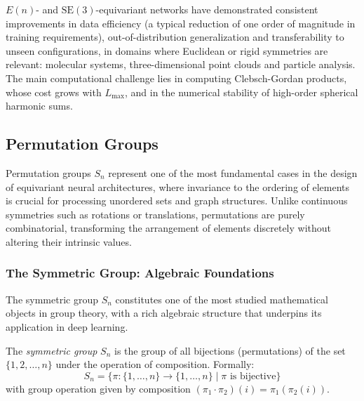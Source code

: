 $E(n)$- and $\text{SE}(3)$-equivariant networks have demonstrated consistent improvements in data efficiency (a typical reduction of one order of magnitude in training requirements), out-of-distribution generalization and transferability to unseen configurations, in domains where Euclidean or rigid symmetries are relevant: molecular systems, three-dimensional point clouds and particle analysis. The main computational challenge lies in computing Clebsch-Gordan products, whose cost grows with $L_{\max}$, and in the numerical stability of high-order spherical harmonic sums.

\subsection{Permutation Groups}\label{subsec:grupos_permutaciones}

Permutation groups $S_n$ represent one of the most fundamental cases in the design of equivariant neural architectures, where invariance to the ordering of elements is crucial for processing unordered sets and graph structures. Unlike continuous symmetries such as rotations or translations, permutations are purely combinatorial, transforming the arrangement of elements discretely without altering their intrinsic values.

\subsubsection{The Symmetric Group: Algebraic Foundations}

The symmetric group $S_n$ constitutes one of the most studied mathematical objects in group theory, with a rich algebraic structure that underpins its application in deep learning.

\begin{definition}\label{def:symmetric_group}
The \textit{symmetric group} $S_n$ is the group of all bijections (permutations) of the set $\{1, 2, \ldots, n\}$ under the operation of composition. Formally:
\begin{equation}
S_n = \{\pi: \{1,\ldots,n\} \to \{1,\ldots,n\} \mid \pi \text{ is bijective}\}
\end{equation}
with group operation given by composition $(\pi_1 \cdot \pi_2)(i) = \pi_1(\pi_2(i))$.
\end{definition}

